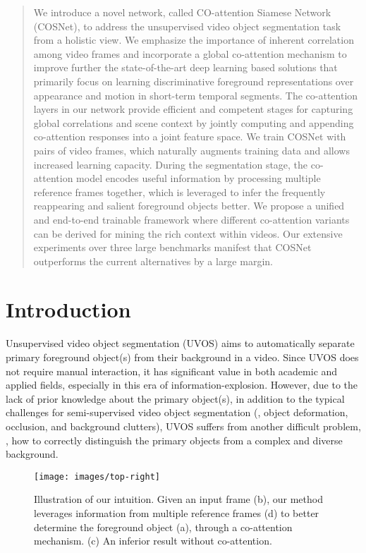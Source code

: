 \documentclass[10pt,twocolumn,letterpaper]{article}
\begin{document}
\begin{abstract}

We introduce a novel network, called CO-attention Siamese Network (COSNet), to address the unsupervised video object segmentation task from a holistic view. We emphasize the importance of inherent correlation among video frames and incorporate a global co-attention mechanism to improve further the state-of-the-art deep learning based solutions that primarily focus on learning discriminative foreground representations over appearance and motion in short-term temporal segments. The co-attention layers in our network provide efficient and competent stages for capturing global correlations and scene context by jointly computing and appending co-attention responses into a joint feature space. We train COSNet with pairs of video frames, which naturally augments training data and allows increased learning capacity. During the segmentation stage, the co-attention model encodes useful information by processing multiple reference frames together, which is leveraged to infer the frequently reappearing and salient foreground objects better. We propose a unified and end-to-end trainable framework where different co-attention variants can be derived for mining the rich context within videos.
Our extensive experiments over three large benchmarks manifest that COSNet outperforms the current alternatives by a large margin. 

\end{abstract}
\vspace*{-8pt}


\section{Introduction}\label{sec:intro}
Unsupervised video object segmentation (UVOS) aims to automatically separate primary foreground object(s) from their background in a video. Since UVOS does not require manual interaction, it has significant value in both academic and applied fields, especially in this  era of information-explosion. However, due to the lack of prior knowledge about the primary object(s), in addition to the typical challenges for semi-supervised video object segmentation (\eg, object deformation, occlusion, and background clutters), UVOS suffers from another difficult problem, \ie, how to correctly distinguish the primary objects from a complex and diverse background.

\begin{figure}\centering
	\texttt{[image: images/top-right]}
	\caption{Illustration of our intuition. Given an input frame (b), our method leverages information from multiple reference frames (d) to better determine the foreground object (a), through a co-attention mechanism. (c) An inferior result without co-attention. }
	\label{fig:demo}
	\vspace{-12pt}
\end{figure}
\end{document}
